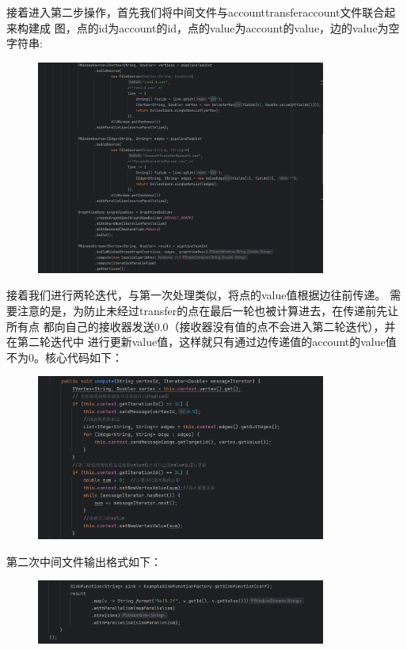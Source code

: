 接着进入第二步操作，首先我们将中间文件与accounttransferaccount文件联合起来构建成
图，点的id为account的id，点的value为account的value，边的value为空字符串:
\begin{figure}[H]
  \begin{center}
    \includegraphics[width=0.85\textwidth,scale=0.7]{./figures/pro4/4.png}
  \end{center}
\end{figure}

接着我们进行两轮迭代，与第一次处理类似，将点的value值根据边往前传递。
需要注意的是，为防止未经过transfer的点在最后一轮也被计算进去，在传递前先让所有点
都向自己的接收器发送0.0（接收器没有值的点不会进入第二轮迭代），并在第二轮迭代中
进行更新value值，这样就只有通过边传递值的account的value值不为0。核心代码如下：
\begin{figure}[H]
  \begin{center}
    \includegraphics[width=0.85\textwidth,scale=0.7]{./figures/pro4/5.png}
  \end{center}
\end{figure}

第二次中间文件输出格式如下：
\begin{figure}[H]
  \begin{center}
    \includegraphics[width=0.85\textwidth,scale=0.7]{./figures/pro4/6.png}
  \end{center}
\end{figure}

